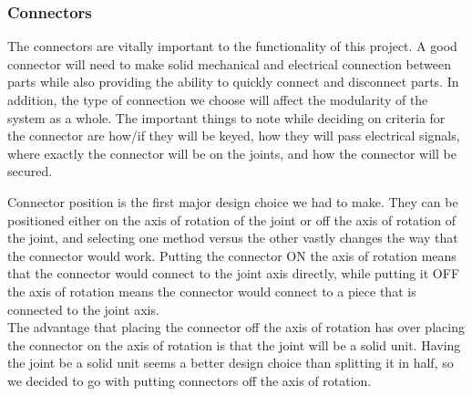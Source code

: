 \subsubsection{Connectors}
The connectors are vitally important to the functionality of this project. A good connector will need to make solid mechanical and electrical connection between parts while also providing the ability to quickly connect and disconnect parts. In addition, the type of connection we choose will affect the modularity of the system as a whole. The important things to note while deciding on criteria for the connector are how/if they will be keyed, how they will pass electrical signals, where exactly the connector will be on the joints, and how the connector will be secured.

Connector position is the first major design choice we had to make. They can be positioned either on the axis of rotation of the joint or off the axis of rotation of the joint, and selecting one method versus the other vastly changes the way that the connector would work. Putting the connector ON the axis of rotation means that the connector would connect to the joint axis directly, while putting it OFF the axis of rotation means the connector would connect to a piece that is connected to the joint axis. \\
\newline
The advantage that placing the connector off the axis of rotation has over placing the connector on the axis of rotation is that the joint will be a solid unit. Having the joint be a solid unit seems a better design choice than splitting it in half, so we decided to go with putting connectors off the axis of rotation.

